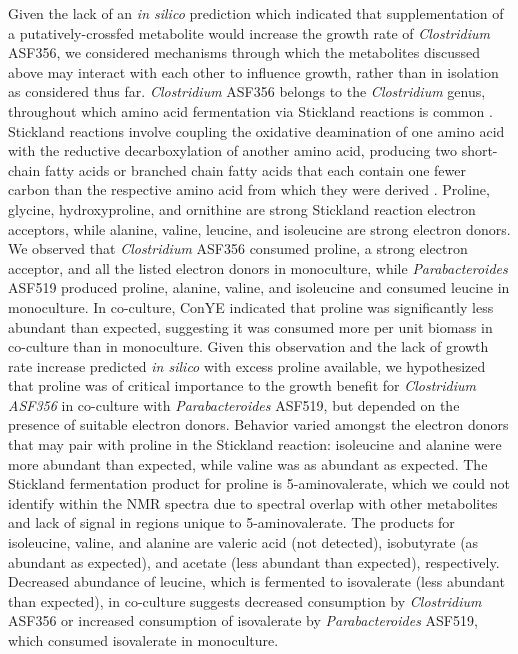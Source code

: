 \documentclass[11pt,twocolumn,notitlepage,openany,twoside]{book}
\begin{document}
\begin{refsection}
Given the lack of an \textit{in silico} prediction which indicated that supplementation of a putatively-crossfed metabolite would increase the growth rate of \textit{Clostridium} ASF356, we considered mechanisms through which the metabolites discussed above may interact with each other to influence growth, rather than in isolation as considered thus far. \textit{Clostridium} ASF356 belongs to the \textit{Clostridium} genus, throughout which amino acid fermentation via Stickland reactions is common \cite{Mead1971-oa}. Stickland reactions involve coupling the oxidative deamination of one amino acid with the reductive decarboxylation of another amino acid, producing two short-chain fatty acids or branched chain fatty acids that each contain one fewer carbon than the respective amino acid from which they were derived \cite{Nisman1954-xl}. Proline, glycine, hydroxyproline, and ornithine are strong Stickland reaction electron acceptors, while alanine, valine, leucine, and isoleucine are strong electron donors. We observed that \textit{Clostridium} ASF356 consumed proline, a strong electron acceptor, and all the listed electron donors in monoculture, while \textit{Parabacteroides} ASF519 produced proline, alanine, valine, and isoleucine and consumed leucine in monoculture. In co-culture, ConYE indicated that proline was significantly less abundant than expected, suggesting it was consumed more per unit biomass in co-culture than in monoculture. Given this observation and the lack of growth rate increase predicted \textit{in silico} with excess proline available, we hypothesized that proline was of critical importance to the growth benefit for \textit{Clostridium ASF356} in co-culture with \textit{Parabacteroides} ASF519, but depended on the presence of suitable electron donors. Behavior varied amongst the electron donors that may pair with proline in the Stickland reaction: isoleucine and alanine were more abundant than expected, while valine was as abundant as expected. The Stickland fermentation product for proline is 5-aminovalerate, which we could not identify within the NMR spectra due to spectral overlap with other metabolites and lack of signal in regions unique to 5-aminovalerate. The products for isoleucine, valine, and alanine are valeric acid (not detected), isobutyrate (as abundant as expected), and acetate (less abundant than expected), respectively. Decreased abundance of leucine, which is fermented to isovalerate (less abundant than expected), in co-culture suggests decreased consumption by \textit{Clostridium} ASF356 or increased consumption of isovalerate by \textit{Parabacteroides} ASF519, which consumed isovalerate in monoculture.


\end{refsection}
\end{document}
